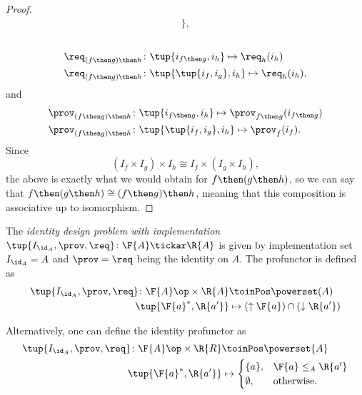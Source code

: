 \begin{proof}
\begin{equation}
\begin{aligned}
            \},
\end{aligned}
\end{equation}
~
\begin{equation}
    \begin{aligned}
    \req_{(f\then g)\then h}  &\colon  \tup{i_{f\then g},i_h} \mapsto \req_h(i_h) \\
    \req_{(f\then g)\then h}  &\colon  \tup{\tup{i_f, i_g},i_h} \mapsto \req_h(i_h),
    \end{aligned}
\end{equation}
and
\begin{equation}
    \begin{aligned}
    \prov_{(f\then g)\then h}  &\colon  \tup{i_{f\then g},i_h} \mapsto \prov_{f\then g}(i_{f\then g})\\
    \prov_{(f\then g)\then h}  &\colon  \tup{\tup{i_f, i_g},i_h} \mapsto \prov_f(i_f).
    \end{aligned}
\end{equation}
Since 
\begin{equation}
    (I_f \times I_g) \times I_{h} \cong  I_f \times (I_g \times I_{h}),
\end{equation}
the above is exactly what we would obtain for $f\then (g\then h)$, so we can say
that  $f\then(g\then h)\cong (f\then g)\then h$, meaning that this composition is associative up to isomorphism.
\end{proof}

\begin{definition}
\label{def:identitydpi}
The \emph{identity design problem with implementation} $\tup{I_{\id_A},\prov,\req} \colon \F{A} \tickar \R{A}$ is given by implementation set $I_{\id_A} = A$ and $\prov=\req$ being
the identity on $A$. The profunctor is defined as
\begin{equation}
\begin{aligned}
\tup{I_{\id_A},\prov,\req} \colon \F{A}\op \times \R{A} &\toinPos \powerset(A) \\
\tup{\F{a}^*,\R{a'}} &\mapsto (\uparrow \F{a}) \cap (\downarrow \R{a'})
\end{aligned}
\end{equation}
\end{definition}
\begin{remark}
Alternatively, one can define the identity profunctor as
\begin{equation}
    \begin{aligned}
    \tup{I_{\id_A},\prov,\req}\colon \F{A}\op \times \R{R} &\toinPos \powerset{A}\\
    \tup{\F{a}^*,\R{a'}}&\mapsto 
    \begin{cases}
    \{a\},&\F{a}\leq_A \R{a'}\\
    \emptyset, &\text{otherwise}.
    \end{cases}
    \end{aligned}
\end{equation}
\end{remark}

